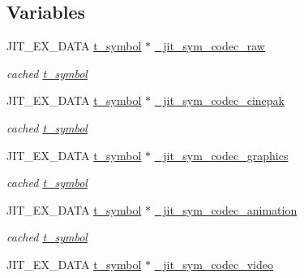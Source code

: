 \subsection*{Variables}
\begin{DoxyCompactItemize}
\item 
\hypertarget{group__jitter_ga43ff77a4b747208cc8df2fe8b295cb20}{
JIT\_\-EX\_\-DATA \hyperlink{structt__symbol}{t\_\-symbol} $\ast$ \hyperlink{group__jitter_ga43ff77a4b747208cc8df2fe8b295cb20}{\_\-jit\_\-sym\_\-codec\_\-raw}}
\label{group__jitter_ga43ff77a4b747208cc8df2fe8b295cb20}

\begin{DoxyCompactList}\small\item\em cached \hyperlink{structt__symbol}{t\_\-symbol} \item\end{DoxyCompactList}\item 
\hypertarget{group__jitter_ga486364eb4af339d3e87c383b0969c567}{
JIT\_\-EX\_\-DATA \hyperlink{structt__symbol}{t\_\-symbol} $\ast$ \hyperlink{group__jitter_ga486364eb4af339d3e87c383b0969c567}{\_\-jit\_\-sym\_\-codec\_\-cinepak}}
\label{group__jitter_ga486364eb4af339d3e87c383b0969c567}

\begin{DoxyCompactList}\small\item\em cached \hyperlink{structt__symbol}{t\_\-symbol} \item\end{DoxyCompactList}\item 
\hypertarget{group__jitter_ga10ca359d6aa3fcd773c8ed884cef4b77}{
JIT\_\-EX\_\-DATA \hyperlink{structt__symbol}{t\_\-symbol} $\ast$ \hyperlink{group__jitter_ga10ca359d6aa3fcd773c8ed884cef4b77}{\_\-jit\_\-sym\_\-codec\_\-graphics}}
\label{group__jitter_ga10ca359d6aa3fcd773c8ed884cef4b77}

\begin{DoxyCompactList}\small\item\em cached \hyperlink{structt__symbol}{t\_\-symbol} \item\end{DoxyCompactList}\item 
\hypertarget{group__jitter_ga5fdf7d5881a2078ba7bc49c1aefb6c53}{
JIT\_\-EX\_\-DATA \hyperlink{structt__symbol}{t\_\-symbol} $\ast$ \hyperlink{group__jitter_ga5fdf7d5881a2078ba7bc49c1aefb6c53}{\_\-jit\_\-sym\_\-codec\_\-animation}}
\label{group__jitter_ga5fdf7d5881a2078ba7bc49c1aefb6c53}

\begin{DoxyCompactList}\small\item\em cached \hyperlink{structt__symbol}{t\_\-symbol} \item\end{DoxyCompactList}\item 
\hypertarget{group__jitter_gac8fe7f4903a14198abac4d2807eba7e8}{
JIT\_\-EX\_\-DATA \hyperlink{structt__symbol}{t\_\-symbol} $\ast$ \hyperlink{group__jitter_gac8fe7f4903a14198abac4d2807eba7e8}{\_\-jit\_\-sym\_\-codec\_\-video}}
\label{group__jitter_gac8fe7f4903a14198abac4d2807eba7e8}


\end{DoxyCompactItemize}

